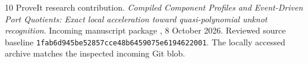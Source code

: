 \begin{thebibliography}{10}
ProveIt research contribution.
\emph{Compiled Component Profiles and Event-Driven Port Quotients:
Exact local acceleration toward quasi-polynomial unknot recognition}.
Incoming manuscript package
, 8 October 2026.
Reviewed source baseline \texttt{1fab6d945be52857cce48b6459075e6194622001}.
The locally accessed archive matches the inspected incoming Git blob.
\end{thebibliography}

